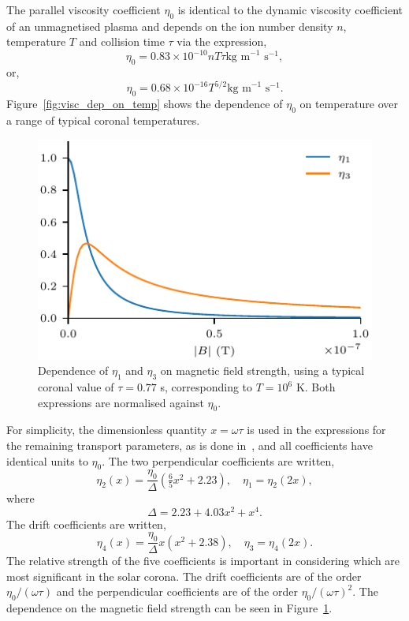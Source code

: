 The parallel viscosity coefficient $\eta_0$ is identical to the dynamic viscosity coefficient of an unmagnetised plasma and depends on the ion number density $n$, temperature $T$ and collision time $\tau$ via the expression,
\begin{equation}
  \label{eq:parallel_visc_coeff}
  \eta_0 = 0.83 \times 10^{-10} n T \tau \text{kg m}^{-1}\text{ s}^{-1},
\end{equation}
or,
\begin{equation}
  \label{eq:parallel_visc_coeff2}
  \eta_0 = 0.68 \times 10^{-16} T^{5/2} \text{kg m}^{-1}\text{ s}^{-1}.
\end{equation}
Figure~\ref{fig:visc_dep_on_temp} shows the dependence of $\eta_0$ on temperature over a range of typical coronal temperatures.

\begin{figure}[t]
  \centering
  \includegraphics[width=0.5\linewidth]{brag_coeffs.pdf}
  \caption{Dependence of $\eta_1$ and $\eta_3$ on magnetic field strength, using a typical coronal value of $\tau = 0.77$ s, corresponding to $T=10^6$ K. Both expressions are normalised against $\eta_0$.}
\label{fig:visc_dep}%
\end{figure}

For simplicity, the dimensionless quantity $x = \omega \tau$ is used in the expressions for the remaining transport parameters, as is done in~\cite{braginskiiTransportProcessesPlasma1965}, and all coefficients have identical units to $\eta_0$. The two perpendicular coefficients are written,
\begin{equation}
  \label{eq:perp_visc_coeff}
  \eta_2(x) = \frac{\eta_0}{\Delta} \left( \tfrac{6}{5} x^2 + 2.23 \right), \quad \eta_1 = \eta_2(2x),
\end{equation}
where
\begin{equation}
  \label{eq:delta}
\Delta = 2.23 + 4.03x^2 + x^4.
\end{equation}
The drift coefficients are written,
\begin{equation}
  \label{eq:drift_visc_coeff}
  \eta_4(x) = \frac{\eta_0}{\Delta} x \left( x^2 + 2.38 \right), \quad \eta_3 = \eta_4(2x).
\end{equation}
The relative strength of the five coefficients is important in considering which are most significant in the solar corona. The drift coefficients are of the order $\eta_0/(\omega \tau)$ and the perpendicular coefficients are of the order $\eta_0/(\omega \tau)^2$. The dependence on the magnetic field strength can be seen in Figure~\ref{fig:visc_dep}.


